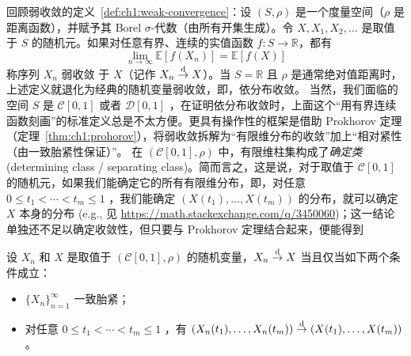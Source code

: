回顾弱收敛的定义~\ref{def:ch1:weak-convergence}：设 $(S, \rho)$ 是一个度量空间（$\rho$ 是距离函数），并赋予其 Borel $\sigma$-代数（由所有开集生成）。令 $X, X_1, X_2, \dots$ 是取值于 $S$ 的随机元。如果对任意有界、连续的实值函数 $f: S \to \mathbb{R}$，都有
\[\lim_{n\to\infty}\mathbb{E}[f(X_n)]=\mathbb{E}[f(X)]\]
称序列 ${X_n}$ 弱收敛 于 $X$（记作 $X_n \overset{\rm d}\to X$）。当 $S = \mathbb{R}$ 且 $\rho$ 是通常绝对值距离时，上述定义就退化为经典的随机变量弱收敛，即，依分布收敛。
当然，我们面临的空间 $S$ 是 $\mathcal C[0,1]$ 或者 $\mathcal D[0,1]$ ，在证明依分布收敛时，上面这个``用有界连续函数刻画''的标准定义总是不太方便。更具有操作性的框架是借助 Prokhorov 定理（定理~\ref{thm:ch1:prohorov}），将弱收敛拆解为``有限维分布的收敛''加上``相对紧性（由一致胎紧性保证）''。
在 $(\mathcal C[0,1],\rho)$ 中，有限维柱集构成了\emph{确定类} (determining class / separating class)。简而言之，这是说，对于取值于 $\mathcal C[0,1]$ 的随机元，如果我们能确定它的所有有限维分布，即，对任意 $0\le t_1<\cdots<t_m\le 1$ ，我们能确定 $(X(t_1),\dots,X(t_m))$ 的分布，就可以确定 $X$ 本身的分布 (e.g., 见 \url{https://math.stackexchange.com/q/3450060})；这一结论单独还不足以确定收敛性，但只要与 Prokhorov 定理结合起来，便能得到

\begin{corollary}\label{cor:ext-fclt:finite-dimensional-tightness}
设 $X_n$ 和 $X$ 是取值于 $(\mathcal C[0,1],\rho)$ 的随机变量，$X_n\overset{\rm d}\to X$ 当且仅当如下两个条件成立：

\begin{itemize}
\tightlist
\item
  $\{X_n\}_{n=1}^\infty$ 一致胎紧；
\item
  对任意 $0\le t_1<\cdots<t_m\le 1$ ，有 $(X_n(t_1),\dots,X_n(t_m))\overset{\rm d}\to (X(t_1),\dots,X(t_m))$ 。
\end{itemize}
\end{corollary}

